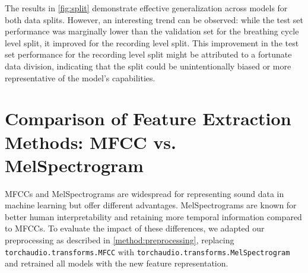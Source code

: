 The results in \autoref{fig:split} demonstrate effective generalization across models for both data splits. However, an interesting trend can be observed: while the test set performance was marginally lower than the validation set for the breathing cycle level split, it improved for the recording level split. This improvement in the test set performance for the recording level split might be attributed to a fortunate data division, indicating that the split could be unintentionally biased or more representative of the model's capabilities.

\section{Comparison of Feature Extraction Methods: MFCC vs. MelSpectrogram}
MFCCs and MelSpectrograms are widespread for representing sound data in machine learning but offer different advantages. MelSpectrograms are known for better human interpretability and retaining more temporal information compared to MFCCs. To evaluate the impact of these differences, we adapted our preprocessing as described in \autoref{method:preprocessing}, replacing \lstinline{torchaudio.transforms.MFCC} with \lstinline{torchaudio.transforms.MelSpectrogram} and retrained all models with the new feature representation.

